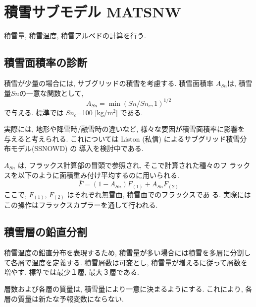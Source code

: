 \section{積雪サブモデル MATSNW}

積雪量, 積雪温度, 積雪アルベドの計算を行う.

\subsection{積雪面積率の診断}

積雪が少量の場合には, サブグリッドの積雪を考慮する.
積雪面積率 $A_{Sn}$は, 積雪量$Sn$の一意な関数として,
\begin{equation}
 A_{Sn} = \min(Sn/Sn_{c}, 1)^{1/2}
\label{snow_asn}
\end{equation}
で与える. 標準では $Sn_c$=100 [kg/m$^2$] である.

実際には, 地形や降雪時/融雪時の違いなど, 様々な要因が積雪面積率に影響を
与えると考えられる.
これについては Liston (私信) によるサブグリッド積雪分布モデル(SSNOWD) の
導入を検討中である.

$A_{Sn}$ は, フラックス計算部の冒頭で参照され, そこで計算された種々のフ
ラックスを以下のように面積重み付け平均するのに用いられる.
\begin{equation}
 \overline{F} = (1-A_{Sn}) F_{(1)} + A_{Sn} F_{(2)}
\end{equation}
ここで, $F_{(1)}$, $F_{(2)}$ はそれぞれ無雪面, 積雪面でのフラックスであ
る. 実際にはこの操作はフラックスカプラーを通して行われる.

\subsection{積雪層の鉛直分割}

積雪温度の鉛直分布を表現するため, 積雪量が多い場合には積雪を多層に分割し
て各層で温度を定義する.
積雪層数は可変とし, 積雪量が増えるに従って層数を増やす. 標準では最少１層,
最大３層である.

層数および各層の質量は, 積雪量により一意に決まるようにする. これにより,
各層の質量は新たな予報変数にならない.

